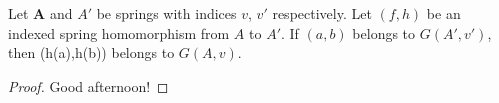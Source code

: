 %

\begin{proposition}
  Let $\mathbf{A}$ and $A'$ be springs with indices $v$, $v'$
  respectively. Let $(f,h)$ be an indexed spring homomorphism from $A$
  to $A'$. If $(a,b)$ belongs to $G(A',v')$, then (h(a),h(b))
  belongs to $G(A,v)$.
\end{proposition}
\begin{proof}
  Good afternoon!
\end{proof}
